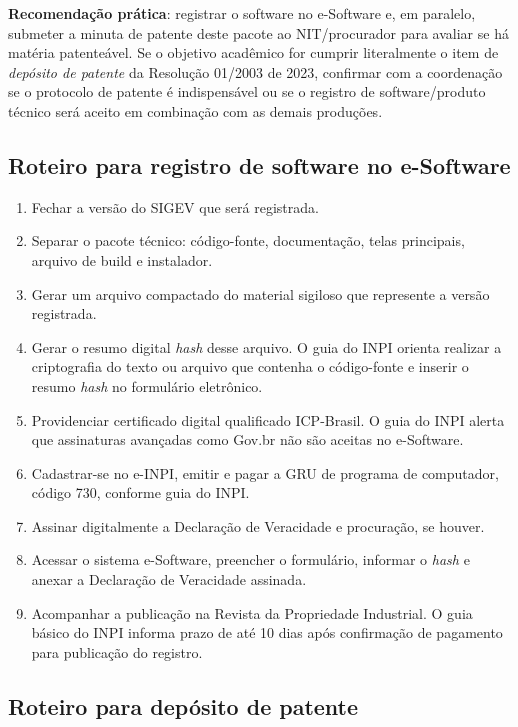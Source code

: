 \textbf{Recomendação prática}: registrar o software no e-Software e, em paralelo, submeter a minuta de patente deste pacote ao NIT/procurador para avaliar se há matéria patenteável. Se o objetivo acadêmico for cumprir literalmente o item de \textit{depósito de patente} da Resolução 01/2003 de 2023, confirmar com a coordenação se o protocolo de patente é indispensável ou se o registro de software/produto técnico será aceito em combinação com as demais produções.

\subsection{Roteiro para registro de software no e-Software}

\begin{enumerate}
  \item Fechar a versão do SIGEV que será registrada.
  \item Separar o pacote técnico: código-fonte, documentação, telas principais, arquivo de build e instalador.
  \item Gerar um arquivo compactado do material sigiloso que represente a versão registrada.
  \item Gerar o resumo digital \textit{hash} desse arquivo. O guia do INPI orienta realizar a criptografia do texto ou arquivo que contenha o código-fonte e inserir o resumo \textit{hash} no formulário eletrônico.
  \item Providenciar certificado digital qualificado ICP-Brasil. O guia do INPI alerta que assinaturas avançadas como Gov.br não são aceitas no e-Software.
  \item Cadastrar-se no e-INPI, emitir e pagar a GRU de programa de computador, código 730, conforme guia do INPI.
  \item Assinar digitalmente a Declaração de Veracidade e procuração, se houver.
  \item Acessar o sistema e-Software, preencher o formulário, informar o \textit{hash} e anexar a Declaração de Veracidade assinada.
  \item Acompanhar a publicação na Revista da Propriedade Industrial. O guia básico do INPI informa prazo de até 10 dias após confirmação de pagamento para publicação do registro.
\end{enumerate}

\subsection{Roteiro para depósito de patente}

